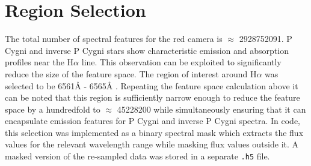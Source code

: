 \section{Region Selection}

The total number of spectral features for the red camera is $\approx$ \num[round-precision=2,round-mode=figures, scientific-notation=true]{2928752091}. P Cygni and inverse P Cygni stars show characteristic emission and absorption profiles near the H$\alpha$ line. This observation can be exploited to significantly reduce the size of the feature space. 
The region of interest around H$\alpha$ was selected to be 6561\r{A} - 6565\r{A} \cite{traven2017galah}. Repeating the feature space calculation above it can be noted that this region is sufficiently narrow enough to reduce the feature space by a hundredfold to $\approx$ \num[round-precision=2,round-mode=figures, scientific-notation=true]{45228200} while simultaneously ensuring that it can encapsulate emission features for P Cygni and inverse P Cygni spectra. In code, this selection was implemented as a binary spectral mask which extracts the flux values for the relevant wavelength range while masking flux values outside it. A masked version of the re-sampled data was stored in a separate \texttt{.h5} file.

